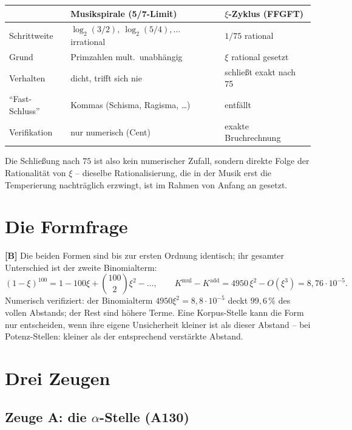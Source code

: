 \begin{center}
\begin{tabular}{lll}
\toprule
 & Musikspirale (5/7-Limit) & $\xi$-Zyklus (FFGFT) \\
\midrule
Schrittweite & $\log_2(3/2),\ \log_2(5/4),\ldots$ irrational & $1/75$ rational \\
Grund & Primzahlen mult.\ unabh\"angig & $\xi$ rational gesetzt \\
Verhalten & dicht, trifft sich nie & schlie\ss t exakt nach 75 \\
\enquote{Fast-Schluss} & Kommas (Schisma, Ragisma, \ldots) & entf\"allt \\
Verifikation & nur numerisch (Cent) & exakte Bruchrechnung \\
\bottomrule
\end{tabular}
\end{center}

Die Schlie\ss ung nach $75$ ist also kein numerischer Zufall, sondern
direkte Folge der Rationalit\"at von $\xi$ -- dieselbe Rationalisierung, die
in der Musik erst die Temperierung nachtr\"aglich erzwingt, ist im Rahmen
von Anfang an gesetzt.

\section{Die Formfrage}
\label{sec:formfrage}

\textbf{[B]} Die beiden Formen sind bis zur ersten Ordnung identisch; ihr
gesamter Unterschied ist der zweite Binomialterm:
\[
  (1-\xi)^{100} = 1 - 100\xi + \binom{100}{2}\xi^2 - \ldots,
  \qquad
  K^{\text{mul}} - K^{\text{add}} = 4950\,\xi^2 - O(\xi^3)
  = 8{,}76\cdot10^{-5}.
\]
Numerisch verifiziert: der Binomialterm $4950\xi^2 = 8{,}8\cdot10^{-5}$
deckt $99{,}6\,\%$ des vollen Abstands; der Rest sind h\"ohere Terme. Eine
Korpus-Stelle kann die Form nur entscheiden, wenn ihre eigene Unsicherheit
kleiner ist als dieser Abstand -- bei Potenz-Stellen: kleiner als der
entsprechend verst\"arkte Abstand.

\section{Drei Zeugen}
\label{sec:zeugen}

\subsection{Zeuge A: die $\alpha$-Stelle (A130)}

